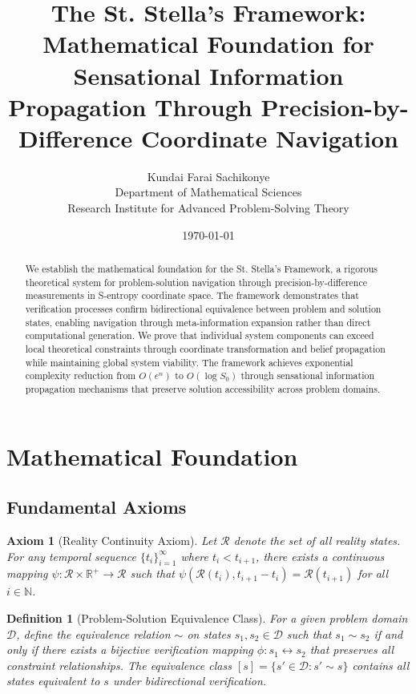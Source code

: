 \documentclass[12pt,a4paper]{article}
\title{The St. Stella's Framework: Mathematical Foundation for Sensational Information Propagation Through Precision-by-Difference Coordinate Navigation}
\author{Kundai Farai Sachikonye\\
Department of Mathematical Sciences\\
Research Institute for Advanced Problem-Solving Theory}
\date{\today}
\newtheorem{definition}{Definition}
\newtheorem{axiom}{Axiom}
\begin{document}
\maketitle

\begin{abstract}
We establish the mathematical foundation for the St. Stella's Framework, a rigorous theoretical system for problem-solution navigation through precision-by-difference measurements in S-entropy coordinate space. The framework demonstrates that verification processes confirm bidirectional equivalence between problem and solution states, enabling navigation through meta-information expansion rather than direct computational generation. We prove that individual system components can exceed local theoretical constraints through coordinate transformation and belief propagation while maintaining global system viability. The framework achieves exponential complexity reduction from $O(e^n)$ to $O(\log S_0)$ through sensational information propagation mechanisms that preserve solution accessibility across problem domains.
\end{abstract}

\section{Mathematical Foundation}

\subsection{Fundamental Axioms}

\begin{axiom}[Reality Continuity Axiom]
\label{axiom:reality_continuity}
Let $\mathcal{R}$ denote the set of all reality states. For any temporal sequence $\{t_i\}_{i=1}^{\infty}$ where $t_i < t_{i+1}$, there exists a continuous mapping $\psi: \mathcal{R} \times \mathbb{R}^+ \to \mathcal{R}$ such that $\psi(\mathcal{R}(t_i), t_{i+1} - t_i) = \mathcal{R}(t_{i+1})$ for all $i \in \mathbb{N}$.
\end{axiom}

\begin{definition}[Problem-Solution Equivalence Class]
\label{def:problem_solution_equiv}
For a given problem domain $\mathcal{D}$, define the equivalence relation $\sim$ on states $s_1, s_2 \in \mathcal{D}$ such that $s_1 \sim s_2$ if and only if there exists a bijective verification mapping $\phi: s_1 \leftrightarrow s_2$ that preserves all constraint relationships. The equivalence class $[s] = \{s' \in \mathcal{D} : s' \sim s\}$ contains all states equivalent to $s$ under bidirectional verification.
\end{definition}
\end{document}
